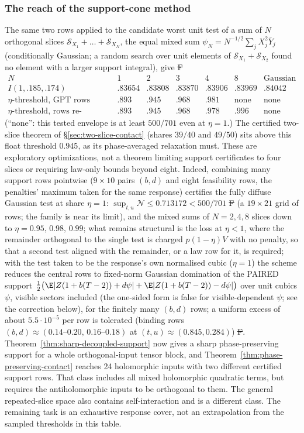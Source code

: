 \subsubsection{The reach of the support-cone method}
The same two rows applied to the candidate worst unit test of a sum of
$N$ orthogonal slices $\mathcal S_{X_1}+\dots+\mathcal S_{X_N}$, the
equal mixed sum $\psi_N=N^{-1/2}\sum_jX_j^2\bar Y_j$ (conditionally
Gaussian; a random search over unit elements of
$\mathcal S_{X_1}+\mathcal S_{X_2}$ found no element with a larger
support integral), give \st{F}
\[
\begin{array}{c|cccccc}
 N&1&2&3&4&8&\text{Gaussian}\\\hline
 I(1,.185,.174)&.83654&.83808&.83870&.83906&.83969&.84042\\
 \eta\text{-threshold, GPT rows}&.893&.945&.968&.981&\text{none}&\text{none}\\
 \eta\text{-threshold, rows re-optimised}&.893&.945&.968&.978&.996&\text{none}
\end{array}
\]
(``none'': this tested envelope is at least $500/701$ even at
$\eta=1$.) The certified two-slice theorem of \S\ref{sec:two-slice-contact} (shares $39/40$ and $49/50$) sits above this float threshold $0.945$, as its phase-averaged relaxation must. These are exploratory optimizations, not a theorem limiting
support certificates to four slices or requiring law-only bounds beyond
eight. Indeed, combining many support rows pointwise ($9\times10$
pairs $(b,d)$ and eight feasibility rows, the penalties' maximum taken
for the same response) certifies the fully diffuse Gaussian test at
share $\eta=1$: $\sup_{t,u}\mathcal N\le0.713172<500/701$ \st{F} (a $19\times21$ grid of rows; the family is near its limit),
and the mixed sums of $N=2,4,8$ slices down to $\eta=0.95,\,0.98,\,0.99$;
what remains structural is the loss at $\eta<1$, where the remainder
orthogonal to the single test is charged $p(1-\eta)V$ with no
penalty, so that a second test aligned with the remainder, or a law
row for it, is required; with the test taken to be the response's own
normalised cubic ($\eta=1$) the scheme reduces the central rows to
fixed-norm Gaussian domination of the PAIRED support
$\frac12\big(\E|Z(1+b(T-2))+d\psi|+\E|Z(1+b(T-2))-d\psi|\big)$ over unit
cubics $\psi$, visible sectors included (the one-sided form is false for visible-dependent $\psi$; see the correction below), for the finitely many $(b,d)$
rows; a uniform excess of about $5.5\cdot10^{-5}$ per row is tolerated (binding rows $(b,d)\approx(0.14\text{--}0.20,\,0.16\text{--}0.18)$ at $(t,u)\approx(0.845,0.284)$) \st{F}. Theorem~\ref{thm:sharp-decoupled-support} now gives a sharp
phase-preserving support for a whole orthogonal-input tensor block,
and Theorem~\ref{thm:phase-preserving-contact} reaches 24 holomorphic
inputs with two different certified support rows. That class includes
all mixed holomorphic quadratic terms, but requires the antiholomorphic
inputs to be orthogonal to them. The general repeated-slice space also
contains self-interaction and is a different class. The remaining task
is an exhaustive response cover, not an extrapolation from the sampled
thresholds in this table.

